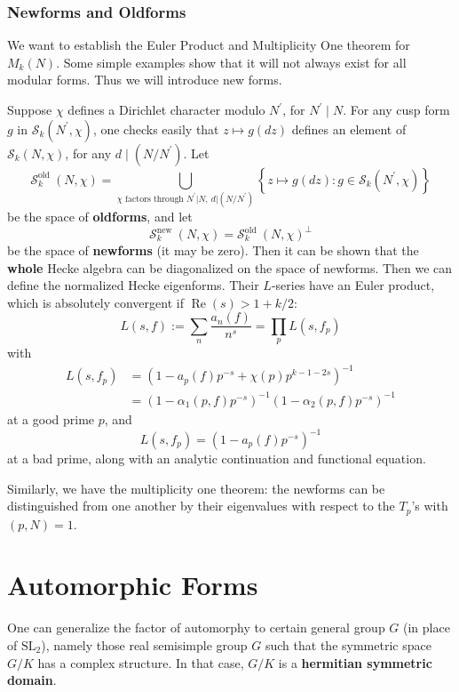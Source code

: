 \documentclass[11pt,english]{smfart}
\theoremstyle{definition}
\theoremstyle{remark}
\renewcommand{\Re}{\mathop{\mathrm{Re}}}
\begin{document}
\subsubsection{Newforms and Oldforms}
We want to establish the Euler Product and Multiplicity One theorem for $M_k(N)$.
Some simple examples show that it will not always exist for all modular forms. Thus we will introduce new forms.

Suppose $ \chi $ defines a Dirichlet character modulo $ N^{\prime} $, for $ N^{\prime} \mid N $.
For any cusp form $ g $ in $ \mathcal{S}_{k}\left(N^{\prime}, \chi\right) $, one checks easily that $ z \mapsto g(d z)$  defines an element of $ \mathcal{S}_{k}(N, \chi) $,
for any $ d \mid\left(N / N^{\prime}\right) $. Let
\[\mathcal{S}_{k}^{\text {old }}(N, \chi)=\bigcup_{\chi {\text { factors through } N^{\prime}|N ,\ d|\left(N / N^{\prime}\right)}}\left\{z \mapsto g(d z): g \in \mathcal{S}_{k}\left(N^{\prime}, \chi\right)\right\}\]
be the space of \textbf{oldforms}, and let
\[\mathcal{S}_{k}^{\text {new }}(N, \chi)=\mathcal{S}_{k}^{\text {old }}(N, \chi)^{\perp}\]
be the space of \textbf{newforms} (it may be zero).
Then it can be shown that the \textbf{whole} Hecke algebra can be diagonalized on the space of newforms.
Then we can define the normalized Hecke eigenforms.
Their $L$-series have an Euler product, which is absolutely convergent if $ \Re(s)>1+k / 2 $:
\[L(s, f):=\sum_{n} \frac{a_{n}(f)}{n^{s}}=\prod_{p} L\left(s, f_{p}\right)\]
with
\[\begin{aligned}
L\left(s, f_{p}\right) & =\left(1-a_{p}(f) p^{-s}+\chi(p) p^{k-1-2 s}\right)^{-1} \\
& =\left(1-\alpha_{1}(p, f) p^{-s}\right)^{-1}\left(1-\alpha_{2}(p, f) p^{-s}\right)^{-1}
\end{aligned}\]
at a good prime $ p $, and
\[L\left(s, f_{p}\right)=\left(1-a_{p}(f) p^{-s}\right)^{-1}\]
at a bad prime, along with an analytic continuation and functional equation.

Similarly, we have the multiplicity one theorem: the newforms can be distinguished from one another by their eigenvalues with respect to the $T_p$'s with $(p, N) = 1$.

\section{Automorphic Forms}
One can generalize the factor of automorphy to certain general group $ G $ (in place of $\mathrm{SL}_{2} $),
namely those real semisimple group $G$ such that the symmetric space $ G / K $ has a complex structure.
In that case, $ G / K $ is a \textbf{hermitian symmetric domain}.
\end{document}
